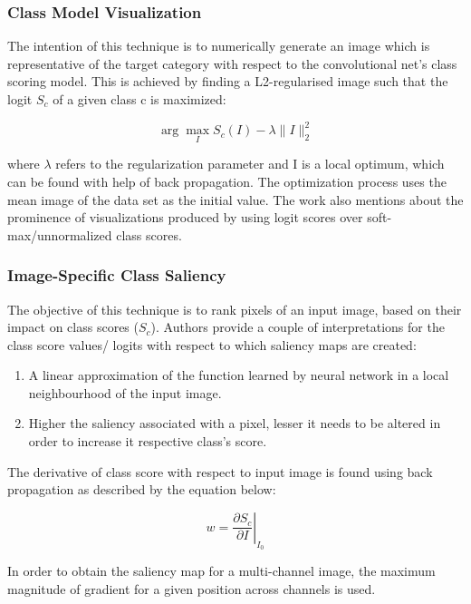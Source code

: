 \documentclass[../report.tex]{subfiles}
\begin{document}
 \subsubsection{Class Model Visualization}
 The intention of this technique is to numerically generate an image which is representative of the target category with respect to the convolutional net’s class scoring model. This is achieved by finding a L2-regularised image such that the logit $S_{c}$  of a given class c is maximized:
 
\begin{equation*}
	\arg \max _I S_c(I)-\lambda\|I\|_2^2
\end{equation*}
 
 where  $\lambda$ refers to the regularization parameter and I is a local optimum, which can be found with help of back propagation. The optimization process uses the mean image of the data set as the initial value. The work also mentions about the prominence of visualizations produced by using logit scores over soft-max/unnormalized class scores.   
    
 \subsubsection{Image-Specific Class Saliency}
  The objective of this technique is to rank pixels of an input image, based on their impact on class scores ($S_c$). Authors provide a couple of interpretations for the class score values/ logits with respect to which saliency maps are created:
  \begin{enumerate}
  	\item A linear approximation of the function learned by  neural network in a local neighbourhood of the input image.
  	\item Higher the saliency associated with a pixel, lesser it needs to be altered in order to increase it respective class’s score.  
  \end{enumerate}

 The derivative of class score with respect to input image is found using back propagation as described by the equation below:
 
\begin{equation*}
	w=\left.\frac{\partial S_c}{\partial I}\right|_{I_0}
\end{equation*}

 In order to obtain the saliency map for a multi-channel image, the maximum magnitude of gradient for a given position across channels is used. 
 
\end{document}

